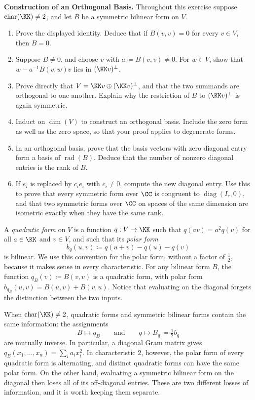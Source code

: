 \documentclass[12pt,reqno]{amsart}
\DeclareMathOperator{\rad}{rad}
\DeclareMathOperator{\diag}{diag}
\begin{document}
\begin{problems}
\item\label{b:orthogonal} \textbf{Construction of an Orthogonal Basis.} Throughout this exercise suppose $\operatorname{char}(\KK)\ne2$, and let $B$ be a symmetric bilinear form on $V$.
\begin{enumerate}
\item Prove the displayed identity. Deduce that if $B(v,v)=0$ for every $v\in V$, then $B=0$.
\item Suppose $B\ne0$, and choose $v$ with $a\coloneqq B(v,v)\ne0$. For $w\in V$, show that $w-a^{-1}B(v,w)v$ lies in $(\KK v)^{\perp}$.
\item Prove directly that $V=\KK v\oplus(\KK v)^{\perp}$, and that the two summands are orthogonal to one another. Explain why the restriction of $B$ to $(\KK v)^{\perp}$ is again symmetric.
\item Induct on $\dim(V)$ to construct an orthogonal basis. Include the zero form as well as the zero space, so that your proof applies to degenerate forms.
\item In an orthogonal basis, prove that the basis vectors with zero diagonal entry form a basis of $\rad(B)$. Deduce that the number of nonzero diagonal entries is the rank of $B$.
\item If $e_i$ is replaced by $c_ie_i$ with $c_i\ne0$, compute the new diagonal entry. Use this to prove that every symmetric form over $\CC$ is congruent to $\diag(I_r,0)$, and that two symmetric forms over $\CC$ on spaces of the same dimension are isometric exactly when they have the same rank.
\end{enumerate}
\end{problems}

\hrulefill

A \emph{quadratic form} on $V$ is a function $q:V\to\KK$ such that $q(av)=a^2q(v)$ for all $a\in\KK$ and $v\in V$, and such that its \emph{polar form}
\[
b_q(u,v)\coloneqq q(u+v)-q(u)-q(v)
\]
is bilinear. We use this convention for the polar form, without a factor of $\tfrac12$, because it makes sense in every characteristic. For any bilinear form $B$, the function $q_B(v)\coloneqq B(v,v)$ is a quadratic form, with polar form $b_{q_B}(u,v)=B(u,v)+B(v,u)$. Notice that evaluating on the diagonal forgets the distinction between the two inputs.

When $\operatorname{char}(\KK)\ne2$, quadratic forms and symmetric bilinear forms contain the same information: the assignments
\[
B\longmapsto q_B\qquad\text{and}\qquad q\longmapsto B_q\coloneqq\tfrac12b_q
\]
are mutually inverse. In particular, a diagonal Gram matrix gives $q_B(x_1,\ldots,x_n)=\sum_ia_ix_i^2$. In characteristic $2$, however, the polar form of every quadratic form is alternating, and distinct quadratic forms can have the same polar form. On the other hand, evaluating a symmetric bilinear form on the diagonal then loses all of its off-diagonal entries. These are two different losses of information, and it is worth keeping them separate.
\end{document}
